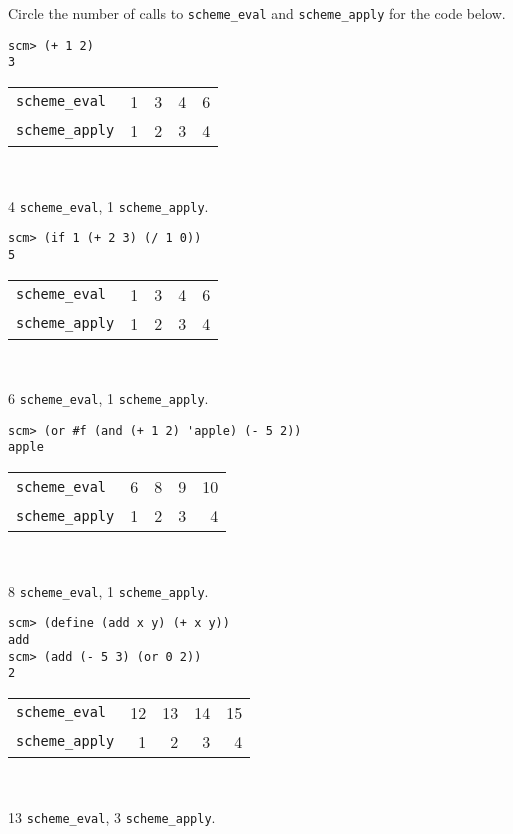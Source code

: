 \begin{blocksection}
\question Circle the number of calls to \lstinline$scheme_eval$ and
\lstinline$scheme_apply$ for the code below.

 \begin{lstlisting}
scm> (+ 1 2)
3
\end{lstlisting}

\begin{tabular}{lrrrr}
\lstinline$scheme_eval$ & 1 & 3 & 4 & 6 \\
\lstinline$scheme_apply$ & 1 & 2 & 3 & 4
\end{tabular}
\\

\begin{solution}
4 \lstinline$scheme_eval$, 1 \lstinline$scheme_apply$.
\end{solution}

 \begin{lstlisting}
scm> (if 1 (+ 2 3) (/ 1 0))
5
\end{lstlisting}

\begin{tabular}{lrrrr}
\lstinline$scheme_eval$ & 1 & 3 & 4 & 6 \\
\lstinline$scheme_apply$ & 1 & 2 & 3 & 4
\end{tabular}
\\

\begin{solution}
6 \lstinline$scheme_eval$, 1 \lstinline$scheme_apply$.
\end{solution}

 \begin{lstlisting}
scm> (or #f (and (+ 1 2) 'apple) (- 5 2))
apple
\end{lstlisting}

\begin{tabular}{lrrrr}
\lstinline$scheme_eval$ & 6 & 8 & 9 & 10 \\
\lstinline$scheme_apply$ & 1 & 2 & 3 & 4
\end{tabular}
\\

\begin{solution}
8 \lstinline$scheme_eval$, 1 \lstinline$scheme_apply$.
\end{solution}

 \begin{lstlisting}
scm> (define (add x y) (+ x y))
add
scm> (add (- 5 3) (or 0 2))
2
\end{lstlisting}

\begin{tabular}{lrrrr}
\lstinline$scheme_eval$ & 12 & 13 & 14 & 15 \\
\lstinline$scheme_apply$ & 1 & 2 & 3 & 4
\end{tabular}
\\

\begin{solution}
13 \lstinline$scheme_eval$, 3 \lstinline$scheme_apply$.
\end{solution}
\end{blocksection}
